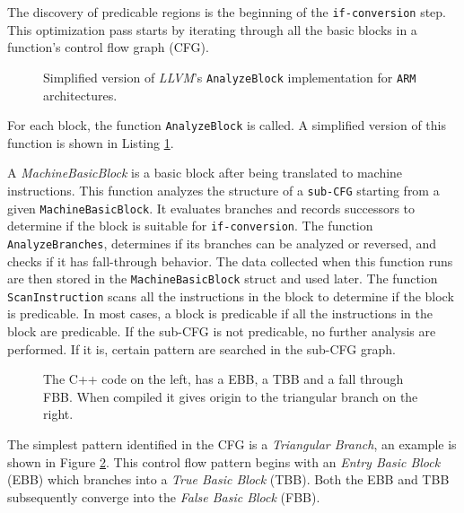 
The discovery of predicable regions is the beginning of the \texttt{if-conversion} step. This optimization pass starts by iterating through all the basic blocks in a function's control flow graph (CFG).

\begin{figure}[H]
    \centering
    
    \caption{Simplified version of \textit{LLVM}'s \texttt{AnalyzeBlock} implementation for \texttt{ARM} architectures.}
    \label{fig:analyze_block}
\end{figure}

For each block, the function \texttt{AnalyzeBlock} is called. A simplified version of this function is shown in Listing \ref{fig:analyze_block}.

A \textit{MachineBasicBlock} is a basic block after being translated to machine instructions.
This function analyzes the structure of a \texttt{sub-CFG} starting from a given \texttt{MachineBasicBlock}. It evaluates branches and records successors to determine if the block is suitable for \texttt{if-conversion}.
The function \texttt{AnalyzeBranches}, determines if its branches can be analyzed or reversed, and checks if it has fall-through behavior. The data collected when this function runs are then stored in the \texttt{MachineBasicBlock} struct and used later. The function \texttt{ScanInstruction} scans all the instructions in the block to determine if the block is predicable. In most cases, a block is predicable if all the instructions in the block are predicable.
If the sub-CFG is not predicable, no further analysis are performed. If it is, certain pattern are searched in the sub-CFG graph. \\

\begin{figure}[H]
    \centering
    
    \caption{The C++ code on the left, has a EBB, a TBB and a fall through FBB. When compiled it gives origin to the triangular branch on the right.}
    \label{fig:triangle_branch}
\end{figure}

The simplest pattern identified in the CFG is a \textit{Triangular Branch}, an example is shown in Figure \ref{fig:triangle_branch}. This control flow pattern begins with an \textit{Entry Basic Block} (EBB) which branches into a \textit{True Basic Block} (TBB). Both the EBB and TBB subsequently converge into the \textit{False Basic Block} (FBB).

